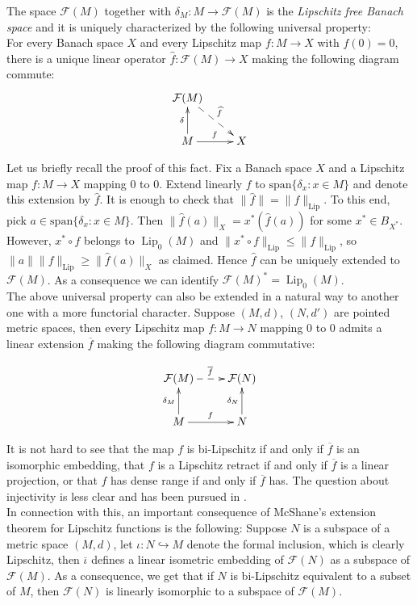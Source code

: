 \documentclass[12pt,leqno]{amsart}
\numberwithin{equation}{section} %
\theoremstyle{definition}
\numberwithin{equation}{section}
\def\Lip{\operatorname{Lip}}
\def\Span{\mathrm{span}}
\begin{document}
The space $\mathcal F(M)$ together with $\delta_M:M\rightarrow \mathcal F(M)$ is the \textit{Lipschitz free Banach space} and it is uniquely characterized by the following universal property:\\

For every Banach space $X$ and every Lipschitz map $f:M\rightarrow X$ with $f(0)=0$, there is a unique linear operator $\widehat f:\mathcal F(M)\rightarrow X$ making  the following diagram commute:
$$
\xymatrix{\mathcal F(M)\ar@{-->}^{\widehat f}[rd]&\\
     M\ar[r]^{f}\ar^{\delta}[u]& X}
$$

Let us briefly recall the proof of this fact. Fix a Banach space $X$ and a Lipschitz map $f:M\rightarrow X$ mapping $0$ to $0$. Extend linearly $f$ to $\Span\{\delta_x: x\in M\}$ and denote this extension by $\widehat{f}$. It is enough to check that $\|\widehat{f}\|=\|f\|_{\Lip}$. To this end, pick  $a\in\Span\{\delta_x: x\in M\}$. Then $\|\widehat{f}(a)\|_X=x^*(\widehat{f}(a))$ for some $x^*\in B_{X^*}$. However, $x^*\circ f$ belongs to $\Lip_0(M)$ and $\|x^*\circ f\|_{\Lip}\leq \|f\|_{\Lip}$, so $\|a\|\|f\|_{\Lip}\geq \|\widehat{f}(a)\|_X$ as claimed. Hence $\widehat{f}$ can be uniquely extended to $\mathcal F(M)$. As a consequence we can identify $\mathcal F(M)^* = \Lip_0(M)$. \\

The above universal property can also be extended in a natural way to another one with a more functorial character. Suppose $(M,d)$, $(N,d')$ are pointed metric spaces, then every Lipschitz map $f:M\rightarrow N$ mapping $0$ to $0$ admits a linear extension $\overline f$ making the following diagram commutative:

$$
\xymatrix{\mathcal F(M)\ar@{-->}[r]^{\overline{f}}& \mathcal F(N)\\
     M\ar[r]^{f}\ar^{\delta_M}[u]& N \ar^{\delta_N}[u]}
$$

It is not hard to see that the map $f$ is bi-Lipschitz if and only if $\overline f$ is an isomorphic embedding, that $f$ is a Lipschitz retract if and only if $\overline f$ is a linear projection, or that $f$ has dense range if and only if $\overline f$ has. The question about injectivity is less clear and has been pursued in \cite{GPP}.\\

In connection with this, an important consequence of McShane's extension theorem for Lipschitz functions \cite[Theorem 1.5.6]{Weaver} is the following: Suppose $N$ is a subspace of a metric space $(M,d)$, let $\iota:N\hookrightarrow M$ denote the formal inclusion, which is clearly Lipschitz, then $\overline{\iota}$ defines a linear isometric embedding of $\mathcal F(N)$ as a subspace of $\mathcal F(M)$. As a consequence, we get that if $N$ is bi-Lipschitz equivalent to a subset of $M$, then $\mathcal F(N)$ is linearly isomorphic to a subspace of $\mathcal F(M)$.\\
\end{document}
